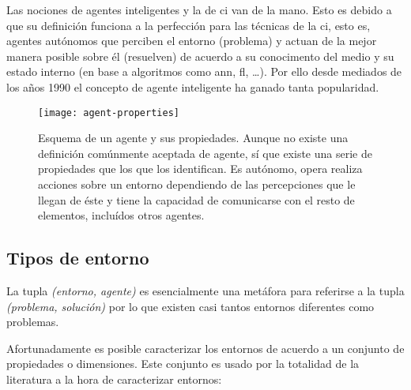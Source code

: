 Las nociones de agentes inteligentes y la de \gls{ci} van de la mano. Esto es debido a que su definición funciona a la perfección para las técnicas de la \gls{ci}, esto es, agentes autónomos que perciben el entorno (problema) y actuan de la mejor manera posible sobre él (resuelven) de acuerdo a su conocimento del medio y su estado interno (en base a algoritmos como \gls{ann}, \gls{fl}, \ldots). Por ello desde mediados de los años 1990 el concepto de agente inteligente ha ganado tanta popularidad.

\begin{figure}[t]
	\texttt{[image: agent-properties]}
	\caption[Esquema de agente y sus propiedades.]{Esquema de un agente y sus propiedades. Aunque no existe una definición comúnmente aceptada de agente, sí que existe una serie de propiedades que los que los identifican. Es autónomo, opera realiza acciones sobre un entorno dependiendo de las percepciones que le llegan de éste y tiene la capacidad de comunicarse con el resto de elementos, incluídos otros agentes.}
	\label{fig:agent-properties}
\end{figure}

\subsection{Tipos de entorno}

La tupla \textit{(entorno, agente)} es esencialmente una metáfora para referirse a la tupla \textit{(problema, solución)} por lo que existen casi tantos entornos diferentes como problemas.

Afortunadamente es posible caracterizar los entornos de acuerdo a un conjunto de propiedades o dimensiones. Este conjunto es usado por la totalidad de la literatura a la hora de caracterizar entornos:

